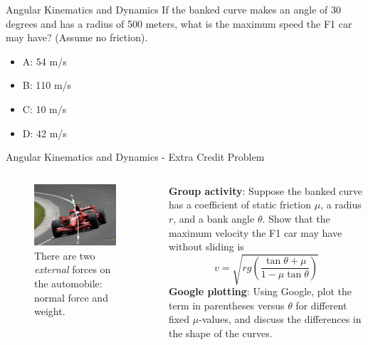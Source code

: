 \documentclass{beamer}
\begin{document}
\begin{frame}{Angular Kinematics and Dynamics}
If the banked curve makes an angle of 30 degrees and has a radius of 500 meters, what is the maximum speed the F1 car may have? (Assume no friction).
\begin{itemize}
\item A: 54 m/s
\item B: 110 m/s
\item C: 10 m/s
\item D: 42 m/s
\end{itemize}
\end{frame}

\begin{frame}{Angular Kinematics and Dynamics - Extra Credit Problem}
\begin{columns}[T]
\begin{column}{0.5\textwidth}
\begin{figure}
\centering
\includegraphics[width=0.9\textwidth]{figures/ferari.pdf}
\caption{\label{fig:ferari2} There are two \alert{\textit{external}} forces on the automobile: normal force and weight.}
\end{figure}
\end{column}
\begin{column}{0.5\textwidth}
\small
\textbf{Group activity}: Suppose the banked curve has a coefficient of static friction $\mu$, a radius $r$, and a bank angle $\theta$.  Show that the maximum velocity the F1 car may have without sliding is 
\begin{equation}
v = \sqrt{rg\left(\frac{\tan\theta+\mu}{1-\mu\tan\theta}\right)}
\end{equation}
\textbf{Google plotting}: Using Google, plot the term in parentheses versus $\theta$ for different fixed $\mu$-values, and discuss the differences in the shape of the curves.
\end{column}
\end{columns}
\end{frame}
\end{document}
